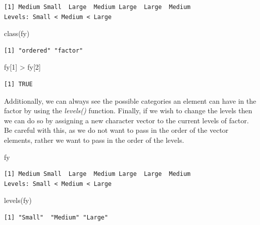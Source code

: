 \documentclass[
  letterpaper,
  DIV=11,
  numbers=noendperiod]{scrreprt}
\newenvironment{Shaded}{\begin{snugshade}}{\end{snugshade}}
\newcommand{\DecValTok}[1]{\textcolor[rgb]{0.68,0.00,0.00}{#1}}
\newcommand{\FunctionTok}[1]{\textcolor[rgb]{0.28,0.35,0.67}{#1}}
\newcommand{\NormalTok}[1]{\textcolor[rgb]{0.00,0.23,0.31}{#1}}
\newcommand{\SpecialCharTok}[1]{\textcolor[rgb]{0.37,0.37,0.37}{#1}}
\begin{document}
\begin{verbatim}
[1] Medium Small  Large  Medium Large  Large  Medium
Levels: Small < Medium < Large
\end{verbatim}

\begin{Shaded}
\begin{Highlighting}[]
\FunctionTok{class}\NormalTok{(fy)}
\end{Highlighting}
\end{Shaded}

\begin{verbatim}
[1] "ordered" "factor" 
\end{verbatim}

\begin{Shaded}
\begin{Highlighting}[]
\NormalTok{fy[}\DecValTok{1}\NormalTok{] }\SpecialCharTok{\textgreater{}}\NormalTok{ fy[}\DecValTok{2}\NormalTok{]}
\end{Highlighting}
\end{Shaded}

\begin{verbatim}
[1] TRUE
\end{verbatim}

Additionally, we can always see the possible categories an element can
have in the factor by using the \emph{levels()} function. Finally, if we
wish to change the levels then we can do so by assigning a new character
vector to the current levels of factor. Be careful with this, as we do
not want to pass in the order of the vector elements, rather we want to
pass in the order of the levels.

\begin{Shaded}
\begin{Highlighting}[]
\NormalTok{fy}
\end{Highlighting}
\end{Shaded}

\begin{verbatim}
[1] Medium Small  Large  Medium Large  Large  Medium
Levels: Small < Medium < Large
\end{verbatim}

\begin{Shaded}
\begin{Highlighting}[]
\FunctionTok{levels}\NormalTok{(fy)}
\end{Highlighting}
\end{Shaded}

\begin{verbatim}
[1] "Small"  "Medium" "Large" 
\end{verbatim}
\end{document}
